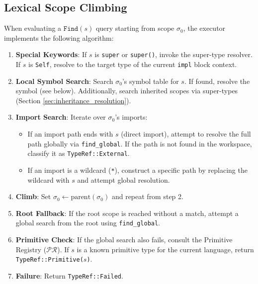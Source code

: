\subsection{Lexical Scope Climbing}
\label{sec:lexical_climbing}

When evaluating a $\texttt{Find}(s)$ query starting from scope
$\sigma_0$, the executor implements the following algorithm:

\begin{enumerate}
  \item \textbf{Special Keywords}: If $s$ is \texttt{super} or
    \texttt{super()}, invoke the super-type resolver. If $s$ is
    \texttt{Self}, resolve to the target type of the current
    \texttt{impl} block context.

  \item \textbf{Local Symbol Search}: Search $\sigma_0$'s symbol
    table for $s$. If found, resolve the symbol (see below).
    Additionally, search inherited scopes via super-types (Section
    \ref{sec:inheritance_resolution}).

  \item \textbf{Import Search}: Iterate over $\sigma_0$'s imports:
    \begin{itemize}
      \item If an import path ends with $s$ (direct import), attempt
        to resolve the full path globally via \texttt{find\_global}.
        If the path is not found in the workspace, classify it as
        \texttt{TypeRef::External}.
      \item If an import is a wildcard (\texttt{*}), construct a
        specific path by replacing the wildcard with $s$ and attempt
        global resolution.
    \end{itemize}

  \item \textbf{Climb}: Set $\sigma_0 \leftarrow
    \text{parent}(\sigma_0)$ and repeat from step 2.

  \item \textbf{Root Fallback}: If the root scope is reached without
    a match, attempt a global search from the root using \texttt{find\_global}.

  \item \textbf{Primitive Check}: If the global search also fails,
    consult the Primitive Registry ($\mathcal{PR}$). If $s$ is a
    known primitive type for the current language, return
    \texttt{TypeRef::Primitive($s$)}.

  \item \textbf{Failure}: Return \texttt{TypeRef::Failed}.
\end{enumerate}

